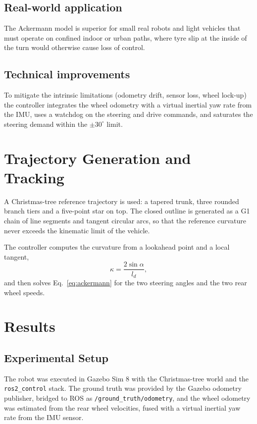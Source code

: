 \documentclass[conference]{IEEEtran}
\begin{document}
\subsection{Real-world application}
The Ackermann model is superior for small real robots and light vehicles that
must operate on confined indoor or urban paths, where tyre slip at the inside of
the turn would otherwise cause loss of control.

\subsection{Technical improvements}
To mitigate the intrinsic limitations (odometry drift, sensor loss, wheel
lock-up) the controller integrates the wheel odometry with a virtual inertial
yaw rate from the IMU, uses a watchdog on the steering and drive commands, and
saturates the steering demand within the $\pm 30^\circ$ limit.

\section{Trajectory Generation and Tracking}
\label{sec:trajectory}

A Christmas-tree reference trajectory is used: a tapered trunk, three rounded
branch tiers and a five-point star on top. The closed outline is generated as a
G1 chain of line segments and tangent circular arcs, so that the reference
curvature never exceeds the kinematic limit of the vehicle.

The controller computes
the curvature from a lookahead point and a local tangent,
\begin{equation}
  \kappa = \frac{2\sin\alpha}{l_d},
  \label{eq:purepursuit}
\end{equation}
and then solves Eq.~\ref{eq:ackermann} for the two steering angles and the two
rear wheel speeds.

\section{Results}
\label{sec:results}

\subsection{Experimental Setup}

The robot was executed in Gazebo Sim 8 with the Christmas-tree world and the
\texttt{ros2\_control} stack. The ground truth was provided by the Gazebo
odometry publisher, bridged to ROS as \texttt{/ground\_truth/odometry}, and the
wheel odometry was estimated from the rear wheel velocities, fused with a
virtual inertial yaw rate from the IMU sensor.
\end{document}
